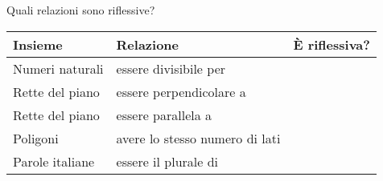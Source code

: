 \begin{comment}
\begin{inaccessibleblock}[Figura: TODO]
 \begin{figure}[t]
\begin{minipage}[b]{.69\textwidth}
 \centering
 
 \caption{Esercizio \ref{ese:B.14}.}\label{fig:B.15}
\end{minipage}\
\begin{minipage}[b]{.3\textwidth}
 \centering
 
 \caption{Esercizio \ref{ese:B.18}.}\label{fig:B.16}
\end{minipage}
\end{figure}
\end{inaccessibleblock}


\end{comment}



\begin{esercizio}
\label{ese:B.19}
Quali relazioni sono riflessive?
\begin{center}
\begin{tabular}{llc}
\toprule
Insieme & Relazione & È riflessiva?\\
\midrule
Numeri naturali & essere divisibile per &  \boxSi\quad\boxNo \\
Rette del piano & essere perpendicolare a &  \boxSi\quad\boxNo \\
Rette del piano & essere parallela a &  \boxSi\quad\boxNo \\
Poligoni & avere lo stesso numero di lati &  \boxSi\quad\boxNo \\
Parole italiane & essere il plurale di &  \boxSi\quad\boxNo \\
\bottomrule
\end{tabular}
\end{center}
\end{esercizio}

